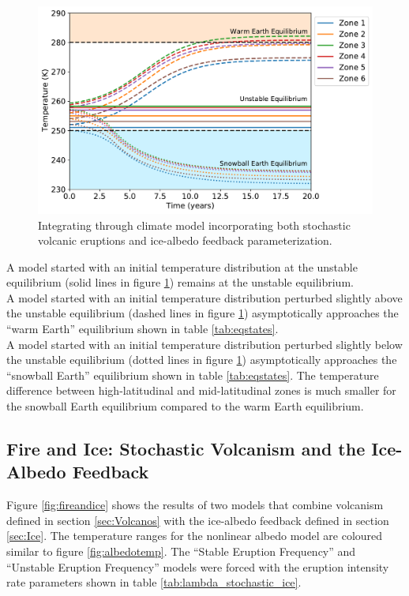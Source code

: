 \documentclass[12pt]{article}
\begin{document}
\begin{figure}[H]
    \centering
    \includegraphics[scale=0.6]{albedo_equilibria_1plot.pdf}
    \caption{
        Integrating through climate model incorporating both stochastic volcanic
        eruptions and ice-albedo feedback parameterization.
    }
    \label{fig:albedo_equil}
\end{figure}
\FloatBarrier

A model started with an initial temperature distribution at the unstable equilibrium
(solid lines in figure \ref{fig:albedo_equil}) remains at the unstable equilibrium. \\

A model started with an initial temperature distribution perturbed slightly above
the unstable equilibrium (dashed lines in figure \ref{fig:albedo_equil}) asymptotically
approaches the ``warm Earth'' equilibrium shown in table \ref{tab:eqstates}. \\

A model started with an initial temperature distribution perturbed slightly below
the unstable equilibrium (dotted lines in figure \ref{fig:albedo_equil}) asymptotically
approaches the ``snowball Earth'' equilibrium shown in table \ref{tab:eqstates}.
The temperature difference between high-latitudinal and mid-latitudinal zones is much
smaller for the snowball Earth equilibrium compared to the warm Earth equilibrium.

\subsection{Fire and Ice: Stochastic Volcanism and the Ice-Albedo Feedback} 
Figure \ref{fig:fireandice} shows the results of two models that combine
volcanism defined in section \ref{sec:Volcanos} with the ice-albedo feedback
defined in section \ref{sec:Ice}. The temperature ranges for the nonlinear albedo model
are coloured similar to figure \ref{fig:albedotemp}. The ``Stable Eruption Frequency'' and
``Unstable Eruption Frequency'' models were forced with the eruption intensity
rate parameters shown in table \ref{tab:lambda_stochastic_ice}.
\end{document}
